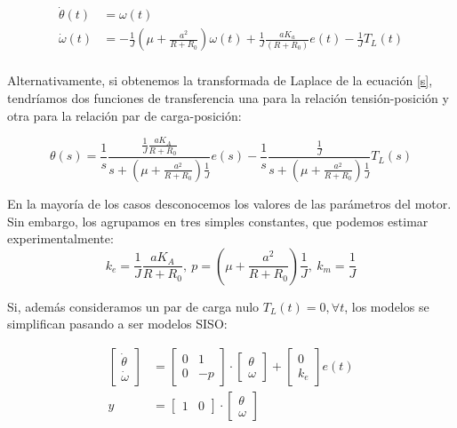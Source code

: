\documentclass[10pt,a4paper]{report}
\begin{document}
\begin{align}
\dot{\theta}(t) &= \omega(t)\\
\dot{\omega}(t) &=-\frac{1}{J}\left(\mu+\frac{a^2}{R+R_0}\right)\omega(t)+\frac{1}{J}\frac{aK_a}{(R+R_0)}e(t)-\frac{1}{J}T_L(t)\\
\end{align}



Alternativamente, si obtenemos la transformada de Laplace de la ecuación \ref{s}, tendríamos dos funciones de transferencia una para la relación tensión-posición y otra para la relación par de carga-posición:

\begin{equation}
\theta(s) = \frac{1}{s}\frac{\frac{1}{J}\frac{aK_A}{R+R_0}}{s+\left(\mu+\frac{a^2}{R+R_0}\right)\frac{1}{J}}e(s)-\frac{1}{s}\frac{\frac{1}{J}}{s+\left(\mu+\frac{a^2}{R+R_0}\right)\frac{1}{J}}T_L(s)
\end{equation}

En la mayoría de los casos desconocemos los valores de las parámetros del motor. Sin embargo, los agrupamos en tres simples constantes, que podemos estimar experimentalmente:
\begin{equation}
k_e = \frac{1}{J}\frac{aK_A}{R+R_0},\ p = \left(\mu+\frac{a^2}{R+R_0}\right)\frac{1}{J},\ k_m = \frac{1}{J}
\end{equation}
 
Si, además consideramos un par de carga nulo $T_L(t) = 0, \forall t$, los modelos se simplifican pasando a ser modelos SISO:

\begin{align} \label{eq311}
\begin{bmatrix}
\dot{\theta}\\
\dot{\omega}
\end{bmatrix} &= \begin{bmatrix}
0 & 1\\
0 &-p
\end{bmatrix}\cdot\begin{bmatrix}
\theta\\
\omega
\end{bmatrix}+\begin{bmatrix}
0\\
k_e
\end{bmatrix}e(t)\\ \label{eq312}
y &= \begin{bmatrix}
1& 0
\end{bmatrix}\cdot\begin{bmatrix}
\theta\\
\omega
\end{bmatrix}
\end{align} 
\end{document}
